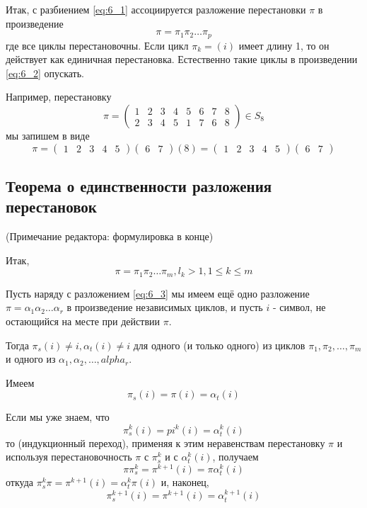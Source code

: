 \documentclass{article}
\begin{document}
Итак, с разбиением \eqref{eq:6_1} ассоциируется разложение перестановки $\pi$ в произведение \begin{equation}
\label{eq:6_2}
\pi = \pi_1\pi_2\dots\pi_p
\end{equation} где все циклы перестановочны. Если цикл $\pi_k = (i)$ имеет длину 1, то он действует как единичная перестановка. Естественно такие циклы в произведении \eqref{eq:6_2} опускать.

Например, перестановку
\[\pi = \left(\begin{matrix}
1&2&3&4&5&6&7&8 \\
2&3&4&5&1&7&6&8
\end{matrix}\right) \in S_8\]
мы запишем в виде
\[\pi = (\begin{matrix} 1&2&3&4&5\end{matrix})(\begin{matrix}6&7\end{matrix})(8) =
(\begin{matrix} 1&2&3&4&5\end{matrix})(\begin{matrix}6&7\end{matrix})\]

\subsection{Теорема о единственности разложения перестановок}

(Примечание редактора: формулировка в конце)

Итак,
\begin{equation}
\label{eq:6_3}
\pi = \pi_1\pi_2\dots\pi_m, l_k > 1, 1 \leq k \leq m
\end{equation}

Пусть наряду с разложением \eqref{eq:6_3} мы имеем ещё одно разложение $\pi = \alpha_1\alpha_2\dots\alpha_r$ в произведение независимых циклов, и пусть $i$ - символ, не остающийся на месте при действии $\pi$.

Тогда $\pi_s(i) \neq i, \alpha_t(i) \neq i$ для одного (и только одного) из циклов $\pi_1, \pi_2, \dots, \pi_m$ и одного из $\alpha_1, \alpha_2, \dots, alpha_r$.

Имеем
\[ \pi_s(i) = \pi(i) = \alpha_t(i) \]

Если мы уже знаем, что \begin{equation}
\label{eq:6_4}
\pi_s^k(i) = pi^k(i) = \alpha_t^k(i)
\end{equation} то (индукционный переход), применяя к этим неравенствам перестановку $\pi$ и используя перестановочность $\pi$ с $\pi_s^k$ и с $\alpha_t^k(i)$, получаем
\[ \pi\pi_s^k = \pi^{k+1}(i) = \pi\alpha_t^k(i) \]
откуда $\pi_s^k\pi = \pi^{k+1}(i) = \alpha_t^k\pi(i)$ и, наконец,
\[ \pi_s^{k+1}(i) = \pi^{k+1}(i) = \alpha_t^{k+1}(i) \]
\end{document}
